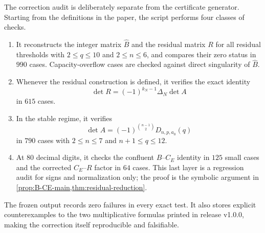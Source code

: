 \documentclass[11pt]{amsart}
\newcommand{\cB}{\widehat B}
\newcommand{\1}{\mathbf 1}
\theoremstyle{remark}
\begin{document}
The correction audit is deliberately separate from the certificate generator.  Starting from the definitions in the paper, the script performs four classes of checks.
\begin{enumerate}[label=\arabic*.]
\item It reconstructs the integer matrix $\cB$ and the residual matrix $R$ for all residual thresholds with $2\le q\le10$ and $2\le n\le6$, and compares their zero status in $990$ cases.  Capacity-overflow cases are checked against direct singularity of $\cB$.
\item Whenever the residual construction is defined, it verifies the exact identity
\[
 \det R=(-1)^{k_N-1}\Delta_N\det A
\]
in $615$ cases.
\item In the stable regime, it verifies
\[
 \det A=(-1)^{\binom{n-1}{2}}D_{n,p,a_0}(q)
\]
in $790$ cases with $2\le n\le7$ and $n+1\le q\le12$.
\item At $80$ decimal digits, it checks the confluent $B$--$C_E$ identity in $125$ small cases and the corrected $C_E$--$R$ factor in $64$ cases.  This last layer is a regression audit for signs and normalization only; the proof is the symbolic argument in \cref{prop:B-CE-main,thm:residual-reduction}.
\end{enumerate}
The frozen output records zero failures in every exact test.  It also stores explicit counterexamples to the two multiplicative formulas printed in release v1.0.0, making the correction itself reproducible and falsifiable.
\end{document}
